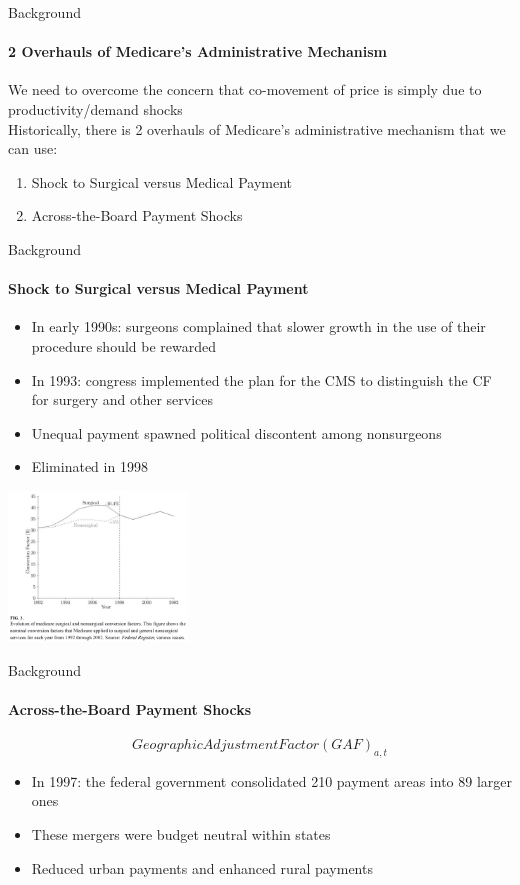 \documentclass{beamer}
\begin{document}
\begin{frame}{Background}
\framesubtitle{2 Overhauls of  Medicare's Administrative Mechanism}
We need to overcome the concern that co-movement of price is simply due to productivity/demand shocks\\
\hfill \break
Historically, there is 2 overhauls of  Medicare's administrative mechanism that we can use:\\
\begin{enumerate}
\item Shock to Surgical versus Medical Payment 
\item Across-the-Board Payment Shocks
\end{enumerate}
\end{frame}

\begin{frame}{Background}
\framesubtitle{Shock to Surgical versus Medical Payment }
\begin{itemize}
\item In early 1990s: surgeons complained that slower growth in the use of their procedure should be rewarded
\item In 1993:  congress implemented the plan for the CMS to distinguish the CF for surgery and other services
\item Unequal payment spawned political discontent among nonsurgeons
\item Eliminated in 1998
\end{itemize}
\begin{center}
\includegraphics[height=4cm]{fig3}
\end{center}
\end{frame}

\begin{frame}{Background}
\framesubtitle{Across-the-Board Payment Shocks }
 $$Geographic Adjustment Factor (GAF)_{a,t}$$
\begin{itemize}
\item In 1997: the federal government consolidated 210 payment areas into 89 larger ones
\item These mergers were budget neutral within states
\item Reduced urban payments and enhanced rural payments

\end{itemize}
\end{frame}
\end{document}

